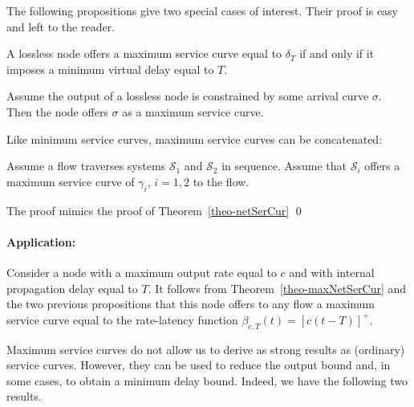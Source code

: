 The following propositions give two special cases of interest.
Their proof is easy and left to the reader.
\begin{proposition}
A lossless node offers a maximum service curve equal to $\delta_T$
if and only if it imposes a minimum virtual delay equal to $T$.
\end{proposition}
\begin{proposition}
Assume the output of a lossless node is constrained by some
arrival curve $\sigma$. Then the node offers $\sigma$ as a maximum
service curve.
\end{proposition}

Like minimum service curves, maximum service curves can be
concatenated:

\begin{theorem}
Assume a flow traverses systems $\mathcal{S}_{1}$ and
$\mathcal{S}_{2}$ in sequence.  Assume that $\mathcal{S}_{i}$
offers a maximum service curve of $\gamma_{i}$, $i=1,2$ to the
flow. 
\end{theorem}
\pr The proof mimics the proof of Theorem~\ref{theo-netSerCur}
\qed

\paragraph{Application: }
Consider a node with a maximum output rate equal to $c$ and with
internal propagation delay equal to $T$. It follows from
Theorem~\ref{theo-maxNetSerCur} and the two previous propositions
that this node offers to any flow a maximum service curve equal to
the rate-latency function $\beta_{c,T}(t)=\left[c(t-T) \right]^+$.

Maximum service curves do not allow us to derive as strong results
as (ordinary) service curves. However, they can be used to reduce
the output bound and, in some cases, to obtain a minimum delay
bound. Indeed, we have the following two results.

